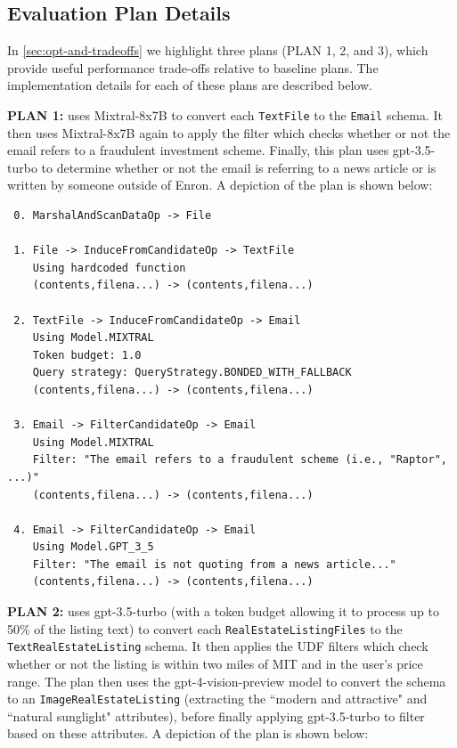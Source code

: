 \subsection*{Evaluation Plan Details}
In \autoref{sec:opt-and-tradeoffs} we highlight three plans (PLAN 1, 2, and 3), which provide useful performance trade-offs relative to baseline plans. The implementation details for each of these plans are described below.

\textbf{PLAN 1:} uses Mixtral-8x7B to convert each \texttt{TextFile} to the \texttt{Email} schema. It then uses Mixtral-8x7B again to apply the filter which checks whether or not the email refers to a fraudulent investment scheme. Finally, this plan uses gpt-3.5-turbo to determine whether or not the email is referring to a news article or is written by someone outside of Enron. A depiction of the plan is shown below:

\lstset{style=mystyle}
\begin{lstlisting}
 0. MarshalAndScanDataOp -> File 

 1. File -> InduceFromCandidateOp -> TextFile 
    Using hardcoded function
    (contents,filena...) -> (contents,filena...)

 2. TextFile -> InduceFromCandidateOp -> Email 
    Using Model.MIXTRAL
    Token budget: 1.0
    Query strategy: QueryStrategy.BONDED_WITH_FALLBACK
    (contents,filena...) -> (contents,filena...)

 3. Email -> FilterCandidateOp -> Email 
    Using Model.MIXTRAL
    Filter: "The email refers to a fraudulent scheme (i.e., "Raptor", ...)"
    (contents,filena...) -> (contents,filena...)

 4. Email -> FilterCandidateOp -> Email 
    Using Model.GPT_3_5
    Filter: "The email is not quoting from a news article..."
    (contents,filena...) -> (contents,filena...)
\end{lstlisting}

\textbf{PLAN 2:} uses gpt-3.5-turbo (with a token budget allowing it to process up to 50\% of the listing text) to convert each \texttt{RealEstateListingFiles} to the \texttt{TextRealEstateListing} schema. It then applies the UDF filters which check whether or not the listing is within two miles of MIT and in the user's price range. The plan then uses the gpt-4-vision-preview model to convert the schema to an \texttt{ImageRealEstateListing} (extracting the ``modern and attractive" and ``natural sunglight" attributes), before finally applying gpt-3.5-turbo to filter based on these attributes. A depiction of the plan is shown below:

